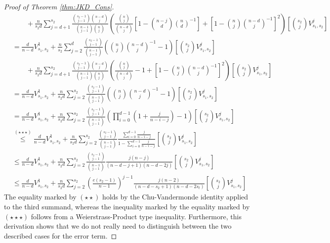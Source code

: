 \begin{proof}[Proof of Theorem \ref{thm:JKD_Cons}]
\begin{equation}
\begin{aligned}
			 & \quad \quad + \frac{n}{s_2 d}\sum_{j = d + 1}^{s_2}\frac{\binom{s_2 - 1}{j - 1}\binom{n - d}{j}}{\binom{n - 1}{j - 1}\binom{n}{j}}
			\left(\frac{\binom{n}{j}}{\binom{n - d}{j}}\left[1 - \binom{n - j}{d}\binom{n}{d}^{-1}\right]
			+ \left[1 - \binom{n}{j}\binom{n-d}{j}^{-1}\right]^{2}\right)\left[\binom{s_2}{j}V_{s_1, s_2}^{j}\right]                                                     \\
			 & = \frac{d}{n - d} V_{s_1, s_2}^{1} + \frac{n}{s_2}\sum_{j = 2}^{d}\frac{\binom{s_2 - 1}{j - 1}}{\binom{n - 1}{j - 1}}
			\left(\binom{n}{j}\binom{n-d}{j}^{-1} - 1\right)\left[\binom{s_2}{j}V_{s_1, s_2}^{j}\right]                                                                  \\
			 & \quad \quad + \frac{n}{s_2 d}\sum_{j = d + 1}^{s_2}\frac{\binom{s_2 - 1}{j - 1}\binom{n - d}{j}}{\binom{n - 1}{j - 1}\binom{n}{j}}
			\left(\frac{\binom{n}{j}}{\binom{n - d}{j}} - 1
			+ \left[1 - \binom{n}{j}\binom{n-d}{j}^{-1}\right]^{2}\right)\left[\binom{s_2}{j}V_{s_1, s_2}^{j}\right]                                                     \\
			 & = \frac{d}{n - d} V_{s_1, s_2}^{1} + \frac{n}{s_2 d}\sum_{j = 2}^{s_2}\frac{\binom{s_2 - 1}{j - 1}}{\binom{n - 1}{j - 1}}
			\left(\binom{n}{j}\binom{n-d}{j}^{-1} - 1\right)\left[\binom{s_2}{j}V_{s_1, s_2}^{j}\right]                                                                  \\
			 & = \frac{d}{n - d} V_{s_1, s_2}^{1} + \frac{n}{s_2 d}\sum_{j = 2}^{s_2}\frac{\binom{s_2 - 1}{j - 1}}{\binom{n - 1}{j - 1}}
			\left(\prod_{i = 0}^{d - 1}\left(1 + \frac{j}{n - i - j}\right) - 1\right)\left[\binom{s_2}{j}V_{s_1, s_2}^{j}\right]                                        \\
			 & \overset{(\star\star\star)}{\leq} \frac{d}{n - d} V_{s_1, s_2}^{1} + \frac{n}{s_2 d}\sum_{j = 2}^{s_2}\frac{\binom{s_2 - 1}{j - 1}}{\binom{n - 1}{j - 1}}
			\frac{\sum_{i = 0}^{d - 1}\frac{j}{n - i - j}}{1 - \sum_{i = 0}^{d - 1}\frac{j}{n - i - j}}\left[\binom{s_2}{j}V_{s_1, s_2}^{j}\right]                       \\
			 & \leq \frac{d}{n - d} V_{s_1, s_2}^{1} + \frac{n}{s_2 d}\sum_{j = 2}^{s_2}\frac{\binom{s_2 - 1}{j - 1}}{\binom{n - 1}{j - 1}}
			\frac{j (n - j)}{(n - d - j + 1)(n - d - 2 j)}\left[\binom{s_2}{j}V_{s_1, s_2}^{j}\right]                                                                    \\
			 & \leq \frac{d}{n - d} V_{s_1, s_2}^{1} + \frac{n}{s_2 d}\sum_{j = 2}^{s_2}\left(\frac{e (s_2 - 1)}{n - 1}\right)^{j-1}
			\frac{j (n - 2)}{(n - d - s_2 + 1)(n - d - 2s_t)}\left[\binom{s_2}{j}V_{s_1, s_2}^{j}\right]
		\end{aligned}
	\end{equation}
	The equality marked by $(\star\star)$ holds by the Chu-Vandermonde identity applied to the third summand, whereas the inequality marked by the equality marked by $(\star\star\star)$ follows from a Weierstrass-Product type inequality.
	Furthermore, this derivation shows that we do not really need to distinguish between the two described cases for the error term.


\end{proof}
